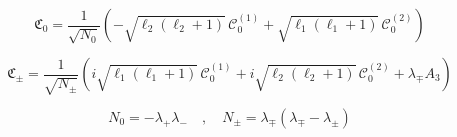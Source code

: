 %
%
\begin{equation}
\mathfrak{C}_{0} = \frac{1}{\sqrt{N_0}}
\left(
-
\sqrt{\ell_2 (\ell_2 + 1)} \, \mathcal{C}_0^{(1)}
+
\sqrt{\ell_1 (\ell_1 + 1)} \, \mathcal{C}_0^{(2)}
\right)
\end{equation}
%
%

%
%
\begin{equation}
\mathfrak{C}_{\pm} = \frac{1}{\sqrt{N_\pm}}
\left(
i \sqrt{\ell_1 (\ell_1 + 1)} \, \mathcal{C}_0^{(1)}
+
i \sqrt{\ell_2 (\ell_2 + 1)} \, \mathcal{C}_0^{(2)}
+
\lambda_{\mp} A_3
\right)
\end{equation}
%
%

%
%
\begin{equation}
N_0 = -\lambda_{+} \lambda_{-}
%
\quad , \quad
%
N_{\pm} = \lambda_{\mp} (\lambda_{\mp} - \lambda_{\pm})
\end{equation}
%
%

